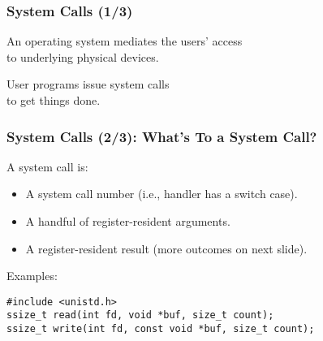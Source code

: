 \begin{frame}

\frametitle{System Calls (1/3)}

\vspace{\fill}

\begin{center}

An operating system mediates the users' access \\ to underlying physical
devices.

\end{center}

\begin{center}

User programs issue system calls \\ to get things done.

\end{center}

\vspace{\fill}

\end{frame}


\begin{frame}[fragile]

\frametitle{System Calls (2/3): What's To a System Call?}

\vspace{\fill}

A system call is:

\begin{itemize}

\item A system call number (i.e., handler has a switch case).

\item A handful of register-resident arguments.

\item A register-resident result (more outcomes on next slide).

\end{itemize}

Examples:

\begin{lstlisting}
#include <unistd.h>
ssize_t read(int fd, void *buf, size_t count);
ssize_t write(int fd, const void *buf, size_t count);
\end{lstlisting}

\vspace{\fill}

\end{frame}


